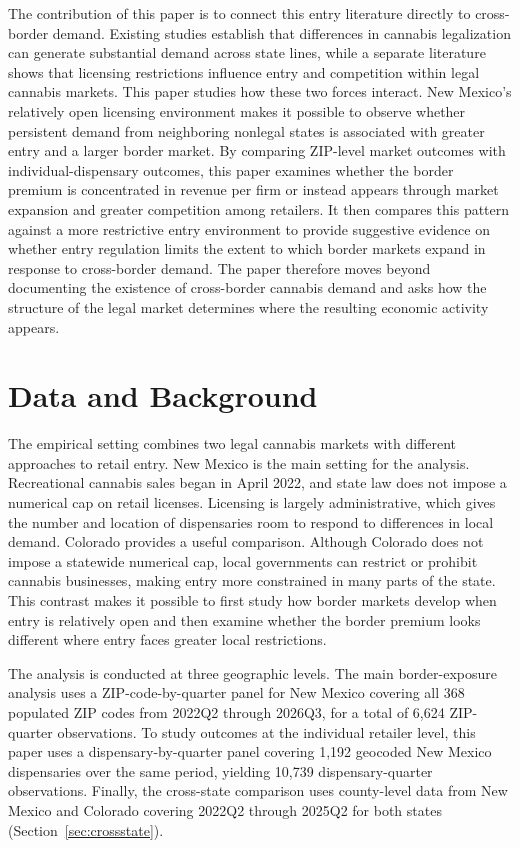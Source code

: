 \documentclass[12pt]{article}
\begin{document}
The contribution of this paper is to connect this entry literature directly to cross-border demand. Existing studies establish that differences in cannabis legalization can generate substantial demand across state lines, while a separate literature shows that licensing restrictions influence entry and competition within legal cannabis markets. This paper studies how these two forces interact. New Mexico's relatively open licensing environment makes it possible to observe whether persistent demand from neighboring nonlegal states is associated with greater entry and a larger border market. By comparing ZIP-level market outcomes with individual-dispensary outcomes, this paper examines whether the border premium is concentrated in revenue per firm or instead appears through market expansion and greater competition among retailers. It then compares this pattern against a more restrictive entry environment to provide suggestive evidence on whether entry regulation limits the extent to which border markets expand in response to cross-border demand. The paper therefore moves beyond documenting the existence of cross-border cannabis demand and asks how the structure of the legal market determines where the resulting economic activity appears.


\section{Data and Background}
\label{sec:data}

The empirical setting combines two legal cannabis markets with different approaches to retail entry. New Mexico is the main setting for the analysis. Recreational cannabis sales began in April 2022, and state law does not impose a numerical cap on retail licenses. Licensing is largely administrative, which gives the number and location of dispensaries room to respond to differences in local demand. Colorado provides a useful comparison. Although Colorado does not impose a statewide numerical cap, local governments can restrict or prohibit cannabis businesses, making entry more constrained in many parts of the state. This contrast makes it possible to first study how border markets develop when entry is relatively open and then examine whether the border premium looks different where entry faces greater local restrictions.

The analysis is conducted at three geographic levels. The main border-exposure analysis uses a ZIP-code-by-quarter panel for New Mexico covering all 368 populated ZIP codes from 2022Q2 through 2026Q3, for a total of 6,624 ZIP-quarter observations. To study outcomes at the individual retailer level, this paper uses a dispensary-by-quarter panel covering 1,192 geocoded New Mexico dispensaries over the same period, yielding 10,739 dispensary-quarter observations. Finally, the cross-state comparison uses county-level data from New Mexico and Colorado covering 2022Q2 through 2025Q2 for both states (Section~\ref{sec:crossstate}).
\end{document}
